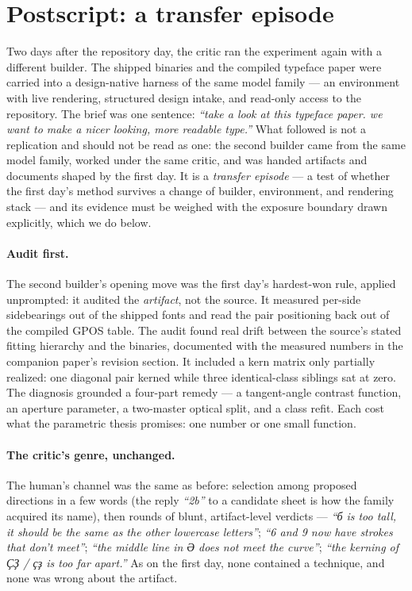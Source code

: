 \documentclass[12pt]{article}
\newcommand{\cz}[1]{{\chu #1}}
\begin{document}
\section{Postscript: a transfer episode}\label{sec:second}

Two days after the repository day, the critic ran the experiment again with a different builder. The shipped binaries and the compiled typeface paper were carried into a design-native harness of the same model family — an environment with live rendering, structured design intake, and read-only access to the repository. The brief was one sentence: \emph{``take a look at this typeface paper. we want to make a nicer looking, more readable type.''} What followed is not a replication and should not be read as one: the second builder came from the same model family, worked under the same critic, and was handed artifacts and documents shaped by the first day. It is a \emph{transfer episode} — a test of whether the first day's method survives a change of builder, environment, and rendering stack — and its evidence must be weighed with the exposure boundary drawn explicitly, which we do below.

\paragraph{Audit first.} The second builder's opening move was the first day's hardest-won rule, applied unprompted: it audited the \emph{artifact}, not the source. It measured per-side sidebearings out of the shipped fonts and read the pair positioning back out of the compiled GPOS table. The audit found real drift between the source's stated fitting hierarchy and the binaries, documented with the measured numbers in the companion paper's revision section. It included a kern matrix only partially realized: one diagonal pair kerned while three identical-class siblings sat at zero. The diagnosis grounded a four-part remedy — a tangent-angle contrast function, an aperture parameter, a two-master optical split, and a class refit. Each cost what the parametric thesis promises: one number or one small function.

\paragraph{The critic's genre, unchanged.} The human's channel was the same as before: selection among proposed directions in a few words (the reply \emph{``2b''} to a candidate sheet is how the family acquired its name), then rounds of blunt, artifact-level verdicts — \emph{``б is too tall, it should be the same as the other lowercase letters''}; \emph{``6 and 9 now have strokes that don't meet''}; \emph{``the middle line in \cz{Ә} does not meet the curve''}; \emph{``the kerning of \cz{ҪҘ} / \cz{ҫҙ} is too far apart.''} As on the first day, none contained a technique, and none was wrong about the artifact.
\end{document}
